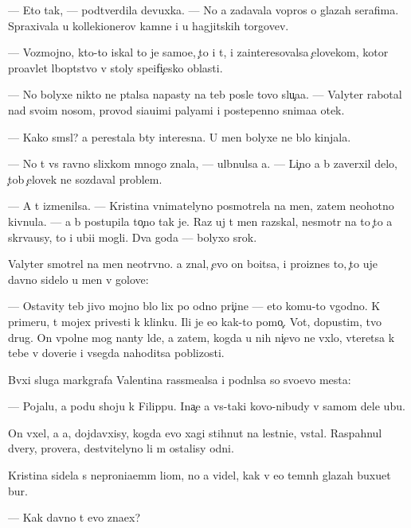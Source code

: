 \documentclass[10pt]{book}
\begin{document}
— Eto tak, — podtverdila devuxka. — No {\y}a zadavala vopros{\yi} o glazah serafima. Spraxivala u kollek{\q}ionerov kamne{\y} i u hagjitskih torgov{\q}ev.

— Vozmojno, kto-to iskal to je samo{\y}e, {\c}to i t{\yi}, i zainteresovalsa {\c}elovekom, kotor{\yi}{\y} pro{\y}avl{\ia}{\y}et l{\iu}bop{\yi}tstvo v stoly spe{\q}ifi{\c}esko{\y} oblasti.

— No bolyxe nikto ne p{\yi}talsa napasty na teb{\ia} posle tovo slu{\c}a{\y}a. — Valyter rabotal nad svo{\y}im nosom, provod{\ia} si{\y}a{\y}u{\x}imi paly{\q}ami i postepenno snima{\y}a otek.

— Kako{\y} sm{\yi}sl? {\Y}a perestala b{\yi}ty interesna. U men{\ia} bolyxe ne b{\yi}lo kinjala.

— No t{\yi} vs{\e} ravno slixkom mnogo znala, — ul{\yi}bnulsa {\y}a. — Li{\c}no {\y}a b{\yi} zaverxil delo, {\c}tob{\yi} {\c}elovek ne sozdaval problem{\yi}.

— A t{\yi} izmenilsa. — Kristina vnimatelyno posmotrela na men{\ia}, zatem neohotno kivnula. — {\Y}a b{\yi} postupila to{\c}no tak je. Raz uj t{\yi} men{\ia} raz{\yi}skal, nesmotr{\ia} na to {\c}to {\y}a skr{\yi}va{\y}usy, to i ubi{\y}{\q}i mogli. Dva goda — bolyxo{\y} srok.

Valyter smotrel na men{\ia} neotr{\yi}vno. {\Y}a znal, {\c}evo on bo{\y}itsa, i proiznes to, {\c}to uje davno sidelo u men{\ia} v golove:

— Ostavity teb{\ia} jivo{\y} mojno b{\yi}lo lix po odno{\y} pri{\c}ine — eto komu-to v{\yi}godno. K primeru, t{\yi} mojex privesti k klinku. Ili je {\y}e{\x}o kak-to pomo{\c}. Vot, dopustim, tvo{\y} drug. On vpolne mog nan{\ia}ty l{\iu}de{\y}, a zatem, kogda u nih ni{\c}evo ne v{\yi}xlo, vteretsa k tebe v doveri{\y}e i vsegda nahoditsa poblizosti.

B{\yi}vxi{\y} sluga markgrafa Valentina rassme{\y}alsa i podn{\ia}lsa so svo{\y}evo mesta:

— Pojalu{\y}, {\y}a po{\y}du shoju k Filippu. Ina{\c}e {\y}a vs{\e}-taki kovo-nibudy v samom dele ub{\y}u.

On v{\yi}xel, a {\y}a, dojdavxisy, kogda {\y}evo xagi stihnut na lestni{\q}e, vstal. Raspahnul dvery, prover{\ia}{\y}a, de{\y}stvitelyno li m{\yi} ostalisy odni.

Kristina sidela s neproni{\q}a{\y}em{\yi}m li{\q}om, no {\y}a videl, kak v {\y}e{\y}o temn{\yi}h glazah buxu{\y}et bur{\ia}.

— Kak davno t{\yi} {\y}evo zna{\y}ex?
\end{document}
